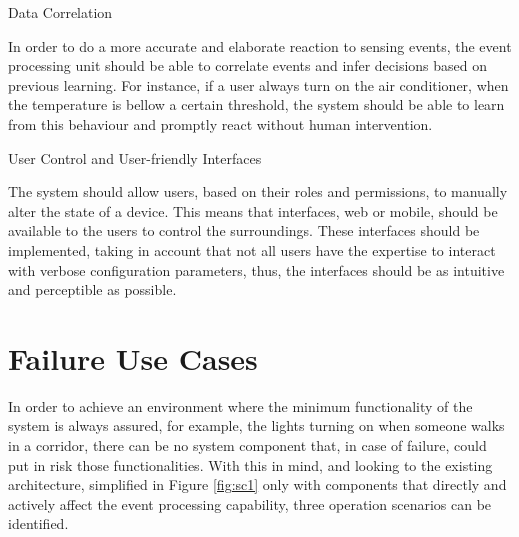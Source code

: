 \begin{Paragraph}{Data Correlation}

In order to do a more accurate and elaborate reaction to sensing events, the event processing unit should be able to correlate events and infer decisions based on previous learning. For instance, if a user always turn on the air conditioner, when the temperature is bellow a certain threshold, the system should be able to learn from this behaviour and promptly react without human intervention.

\end{Paragraph}

\begin{Paragraph}{User Control and User-friendly Interfaces}
	
The system should allow users, based on their roles and permissions, to manually alter the state of a device. This means that interfaces, web or mobile, should be available to the users to control the surroundings. These interfaces should be implemented, taking in account that not all users have the expertise to interact with verbose configuration parameters, thus, the interfaces should be as intuitive and perceptible as possible.

	
\end{Paragraph}




\section{Failure Use Cases}
\label{Architecture:usecases}

In order to achieve an environment where the minimum functionality of the system is always assured, for example, the lights turning on when someone walks in a corridor, there can be no system component that, in case of failure, could put in risk those functionalities. With this in mind, and looking to the existing architecture, simplified in Figure \ref{fig:sc1} only with components that directly and actively affect the event processing capability, three operation scenarios can be identified. 


